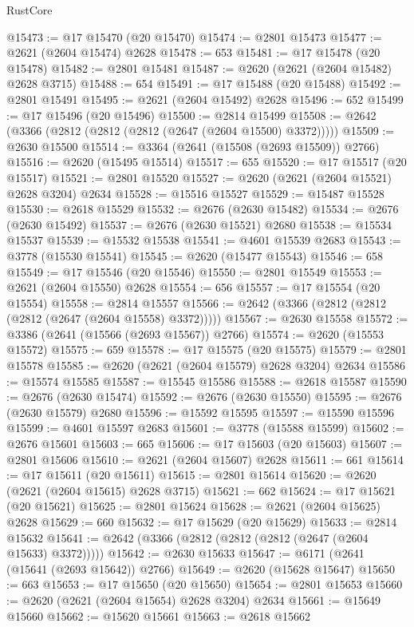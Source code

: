 \begin{lexlean}{RustCore}
\begin{coremodule}
@15473 := @17 @15470 (@20 @15470)
@15474 := @2801 @15473
@15477 := @2621 (@2604 @15474) @2628
@15478 := 653
@15481 := @17 @15478 (@20 @15478)
@15482 := @2801 @15481
@15487 := @2620 (@2621 (@2604 @15482) @2628 @3715)
@15488 := 654
@15491 := @17 @15488 (@20 @15488)
@15492 := @2801 @15491
@15495 := @2621 (@2604 @15492) @2628
@15496 := 652
@15499 := @17 @15496 (@20 @15496)
@15500 := @2814 @15499
@15508 := @2642 (@3366 (@2812 (@2812 (@2812 (@2647 (@2604 @15500) @3372)))))
@15509 := @2630 @15500
@15514 := @3364 (@2641 (@15508 (@2693 @15509)) @2766)
@15516 := @2620 (@15495 @15514)
@15517 := 655
@15520 := @17 @15517 (@20 @15517)
@15521 := @2801 @15520
@15527 := @2620 (@2621 (@2604 @15521) @2628 @3204) @2634
@15528 := @15516 @15527
@15529 := @15487 @15528
@15530 := @2618 @15529
@15532 := @2676 (@2630 @15482)
@15534 := @2676 (@2630 @15492)
@15537 := @2676 (@2630 @15521) @2680
@15538 := @15534 @15537
@15539 := @15532 @15538
@15541 := @4601 @15539 @2683
@15543 := @3778 (@15530 @15541)
@15545 := @2620 (@15477 @15543)
@15546 := 658
@15549 := @17 @15546 (@20 @15546)
@15550 := @2801 @15549
@15553 := @2621 (@2604 @15550) @2628
@15554 := 656
@15557 := @17 @15554 (@20 @15554)
@15558 := @2814 @15557
@15566 := @2642 (@3366 (@2812 (@2812 (@2812 (@2647 (@2604 @15558) @3372)))))
@15567 := @2630 @15558
@15572 := @3386 (@2641 (@15566 (@2693 @15567)) @2766)
@15574 := @2620 (@15553 @15572)
@15575 := 659
@15578 := @17 @15575 (@20 @15575)
@15579 := @2801 @15578
@15585 := @2620 (@2621 (@2604 @15579) @2628 @3204) @2634
@15586 := @15574 @15585
@15587 := @15545 @15586
@15588 := @2618 @15587
@15590 := @2676 (@2630 @15474)
@15592 := @2676 (@2630 @15550)
@15595 := @2676 (@2630 @15579) @2680
@15596 := @15592 @15595
@15597 := @15590 @15596
@15599 := @4601 @15597 @2683
@15601 := @3778 (@15588 @15599)
@15602 := @2676 @15601
@15603 := 665
@15606 := @17 @15603 (@20 @15603)
@15607 := @2801 @15606
@15610 := @2621 (@2604 @15607) @2628
@15611 := 661
@15614 := @17 @15611 (@20 @15611)
@15615 := @2801 @15614
@15620 := @2620 (@2621 (@2604 @15615) @2628 @3715)
@15621 := 662
@15624 := @17 @15621 (@20 @15621)
@15625 := @2801 @15624
@15628 := @2621 (@2604 @15625) @2628
@15629 := 660
@15632 := @17 @15629 (@20 @15629)
@15633 := @2814 @15632
@15641 := @2642 (@3366 (@2812 (@2812 (@2812 (@2647 (@2604 @15633) @3372)))))
@15642 := @2630 @15633
@15647 := @6171 (@2641 (@15641 (@2693 @15642)) @2766)
@15649 := @2620 (@15628 @15647)
@15650 := 663
@15653 := @17 @15650 (@20 @15650)
@15654 := @2801 @15653
@15660 := @2620 (@2621 (@2604 @15654) @2628 @3204) @2634
@15661 := @15649 @15660
@15662 := @15620 @15661
@15663 := @2618 @15662

\end{coremodule}
\end{lexlean}
